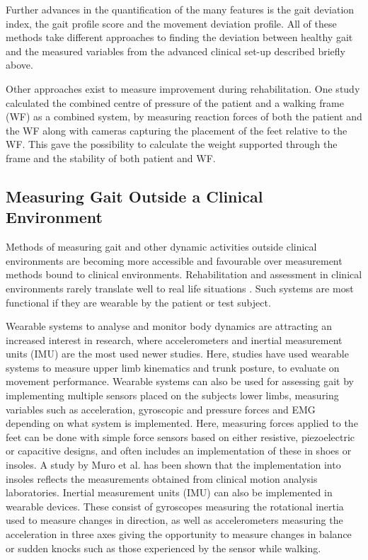Further advances in the quantification of the many features is the gait deviation index, the gait profile score and the movement deviation profile. All of these methods take different approaches to finding the deviation between healthy gait and the measured variables from the advanced clinical set-up described briefly above. \cite{Sandrini2018}

Other approaches exist to measure improvement during rehabilitation. One study calculated the combined centre of pressure of the patient and a walking frame (WF) as a combined system, by measuring reaction forces of both the patient and the WF along with cameras capturing the placement of the feet relative to the WF. This gave the possibility to calculate the weight supported through the frame and the stability of both patient and WF. \cite{Costamagna2017}

\subsection{Measuring Gait Outside a Clinical Environment}

Methods of measuring gait and other dynamic activities outside clinical environments are becoming more accessible and favourable over measurement methods bound to clinical environments. Rehabilitation and assessment in clinical environments rarely translate well to real life situations \cite{Basteris2014}. Such systems are most functional if they are wearable by the patient or test subject. 

Wearable systems to analyse and monitor body dynamics are attracting an increased interest in research, where accelerometers and inertial measurement units (IMU) are the most used newer studies. Here, studies have used wearable systems to measure upper limb kinematics and trunk posture, to evaluate on movement performance. \cite{Wang2017} Wearable systems can also be used for assessing gait by implementing multiple sensors placed on the subjects lower limbs, measuring variables such as acceleration, gyroscopic and pressure forces and EMG depending on what system is implemented. Here, measuring forces applied to the feet can be done with simple force sensors based on either resistive, piezoelectric or capacitive designs, and often includes an implementation of these in shoes or insoles. \cite{Muro2014} A study by Muro et al. \cite{Muro2014} has been shown that the implementation into insoles reflects the measurements obtained from clinical motion analysis laboratories. 
Inertial measurement units (IMU) can also be implemented in wearable devices. These consist of gyroscopes measuring the rotational inertia used to measure changes in direction, as well as accelerometers measuring the acceleration in three axes giving the opportunity to measure changes in balance or sudden knocks such as those experienced by the sensor while walking. \cite{Muro2014}

